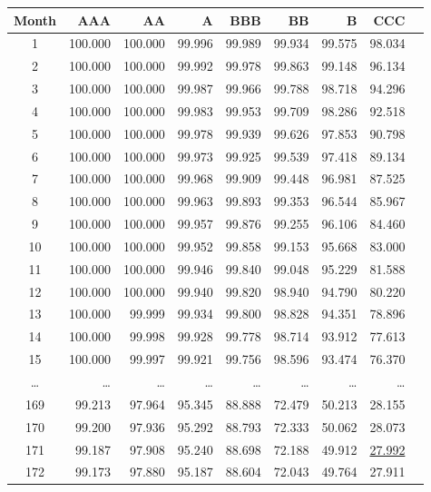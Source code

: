 \documentclass[a4paper,12pt,final]{article}
\begin{document}
\begin{table}[!hb]
\begin{center}
{\small
\begin{tabular}[]{c|rrrrrrrr}
Month &  AAA   &  AA    &   A    &  BBB   &  BB    &   B    &  CCC   \\
\hline
1   & 100.000 & 100.000 &  99.996 &  99.989 &  99.934 &  99.575 &  98.034 \\
2   & 100.000 & 100.000 &  99.992 &  99.978 &  99.863 &  99.148 &  96.134 \\
3   & 100.000 & 100.000 &  99.987 &  99.966 &  99.788 &  98.718 &  94.296 \\
4   & 100.000 & 100.000 &  99.983 &  99.953 &  99.709 &  98.286 &  92.518 \\
5   & 100.000 & 100.000 &  99.978 &  99.939 &  99.626 &  97.853 &  90.798 \\
6   & 100.000 & 100.000 &  99.973 &  99.925 &  99.539 &  97.418 &  89.134 \\
7   & 100.000 & 100.000 &  99.968 &  99.909 &  99.448 &  96.981 &  87.525 \\
8   & 100.000 & 100.000 &  99.963 &  99.893 &  99.353 &  96.544 &  85.967 \\
9   & 100.000 & 100.000 &  99.957 &  99.876 &  99.255 &  96.106 &  84.460 \\
10  & 100.000 & 100.000 &  99.952 &  99.858 &  99.153 &  95.668 &  83.000 \\
11  & 100.000 & 100.000 &  99.946 &  99.840 &  99.048 &  95.229 &  81.588 \\
12  & 100.000 & 100.000 &  99.940 &  99.820 &  98.940 &  94.790 &  80.220 \\
13  & 100.000 &  99.999 &  99.934 &  99.800 &  98.828 &  94.351 &  78.896 \\
14  & 100.000 &  99.998 &  99.928 &  99.778 &  98.714 &  93.912 &  77.613 \\
15  & 100.000 &  99.997 &  99.921 &  99.756 &  98.596 &  93.474 &  76.370 \\
\ldots & \ldots & \ldots & \ldots & \ldots & \ldots & \ldots & \ldots \\
169 &  99.213 &  97.964 &  95.345 &  88.888 &  72.479 &  50.213 &  28.155 \\
170 &  99.200 &  97.936 &  95.292 &  88.793 &  72.333 &  50.062 &  28.073 \\
171 &  99.187 &  97.908 &  95.240 &  88.698 &  72.188 &  49.912 &  \underline{27.992} \\
172 &  99.173 &  97.880 &  95.187 &  88.604 &  72.043 &  49.764 &  27.911 \\

\end{tabular}}
\end{center}
\end{table}
\end{document}
